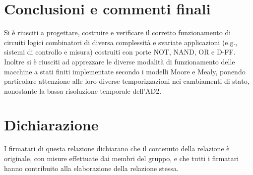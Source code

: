\documentclass[10pt, a4paper, italian]{article}
\begin{document}
\section*{Conclusioni e commenti finali}
Si è riusciti a progettare, costruire e verificare il corretto funzionamento
di circuiti logici combinatori di diversa complessità e svariate applicazioni
(e.g., sistemi di controllo e misura) costruiti con porte NOT, NAND, OR e D-FF.
Inoltre si è riusciti ad apprezzare le diverse modalità di funzionamento delle
macchine a stati finiti implementate secondo i modelli Moore e Mealy, ponendo
particolare attenzione alle loro diverse temporizzazioni nei cambiamenti di
stato, nonostante la bassa risoluzione temporale dell'AD2.

\section*{Dichiarazione}
I firmatari di questa relazione dichiarano che il contenuto della relazione \`e
originale, con misure effettuate dai membri del gruppo, e che tutti i firmatari
hanno contribuito alla elaborazione della relazione stessa.
\end{document}
